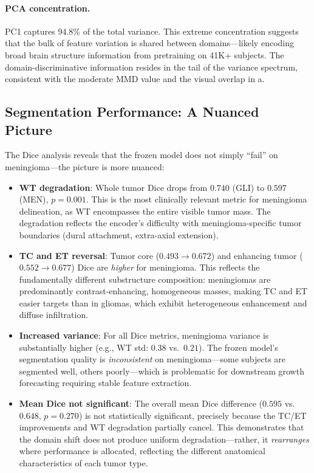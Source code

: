 \documentclass[11pt,a4paper]{article}
\theoremstyle{definition}
\begin{document}
\paragraph{PCA concentration.} PC1 captures 94.8\% of the total variance. This extreme concentration suggests that the bulk of feature variation is shared between domains---likely encoding broad brain structure information from pretraining on 41K+ subjects. The domain-discriminative information resides in the tail of the variance spectrum, consistent with the moderate MMD value and the visual overlap in a.

\subsection{Segmentation Performance: A Nuanced Picture}

The Dice analysis reveals that the frozen model does not simply ``fail'' on meningioma---the picture is more nuanced:

\begin{itemize}[nosep]
  \item \textbf{WT degradation}: Whole tumor Dice drops from $0.740$ (GLI) to $0.597$ (MEN), $p = 0.001$. This is the most clinically relevant metric for meningioma delineation, as WT encompasses the entire visible tumor mass. The degradation reflects the encoder's difficulty with meningioma-specific tumor boundaries (dural attachment, extra-axial extension).

  \item \textbf{TC and ET reversal}: Tumor core ($0.493 \to 0.672$) and enhancing tumor ($0.552 \to 0.677$) Dice are \emph{higher} for meningioma. This reflects the fundamentally different substructure composition: meningiomas are predominantly contrast-enhancing, homogeneous masses, making TC and ET easier targets than in gliomas, which exhibit heterogeneous enhancement and diffuse infiltration.

  \item \textbf{Increased variance}: For all Dice metrics, meningioma variance is substantially higher (e.g., WT std: $0.38$ vs.\ $0.21$). The frozen model's segmentation quality is \emph{inconsistent} on meningioma---some subjects are segmented well, others poorly---which is problematic for downstream growth forecasting requiring stable feature extraction.

  \item \textbf{Mean Dice not significant}: The overall mean Dice difference ($0.595$ vs.\ $0.648$, $p = 0.270$) is not statistically significant, precisely because the TC/ET improvements and WT degradation partially cancel. This demonstrates that the domain shift does not produce uniform degradation---rather, it \emph{rearranges} where performance is allocated, reflecting the different anatomical characteristics of each tumor type.
\end{itemize}
\end{document}
